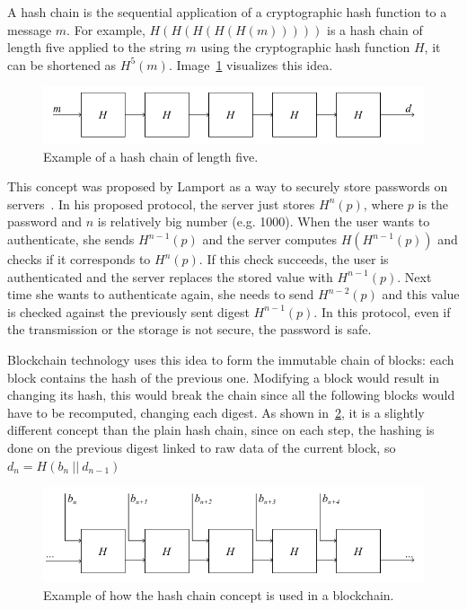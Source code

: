 A hash chain is the sequential application of a cryptographic hash function to a message $m$. For example, $H(H(H(H(H(m)))))$ is a hash chain of length five applied to the string $m$ using the cryptographic hash function $H$, it can be shortened as $H^5(m)$. Image~\ref{fig:hash-chain-1} visualizes this idea.

\begin{figure}[H]
  \centering
  \includegraphics[width=1\textwidth]{Figures/background/hashchain_1.jpg}
  \caption[]{Example of a hash chain of length five.}
  \label{fig:hash-chain-1}
\end{figure}

This concept was proposed by Lamport as a way to securely store passwords on servers~\cite{hashchain}. In his proposed protocol, the server just stores $H^n(p)$, where $p$ is the password and $n$ is relatively big number (e.g. 1000). When the user wants to authenticate, she sends $H^{n-1}(p)$ and the server computes $H(H^{n-1}(p))$ and checks if it corresponds to $H^n(p)$. If this check succeeds, the user is authenticated and the server replaces the stored value with $H^{n-1}(p)$. Next time she wants to authenticate again, she needs to send $H^{n-2}(p)$ and this value is checked against the previously sent digest $H^{n-1}(p)$. In this protocol, even if the transmission or the storage is not secure, the password is safe.

Blockchain technology uses this idea to form the immutable chain of blocks: each block contains the hash of the previous one. Modifying a block would result in changing its hash, this would break the chain since all the following blocks would have to be recomputed, changing each digest. As shown in~\cref{fig:hash-chain-2}, it is a slightly different concept than the plain hash chain, since on each step, the hashing is done on the previous digest linked to raw data of the current block, so $d_{n}=H(b_n~||~d_{n-1})$

\begin{figure}[H]
  \centering
  \includegraphics[width=1\textwidth]{Figures/background/hashchain_2.jpg}
  \caption[]{Example of how the hash chain concept is used in a blockchain.}
  \label{fig:hash-chain-2}
\end{figure}

